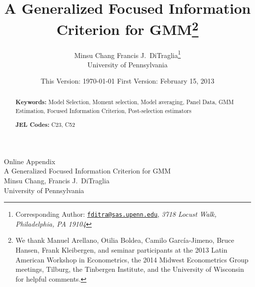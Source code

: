 \documentclass[12pt]{article}
\begin{document}
\title{A Generalized Focused Information Criterion for GMM\footnote{We thank Manuel Arellano, Otilia Boldea, Camilo Garc\'{i}a-Jimeno, Bruce Hansen, Frank Kleibergen, and seminar participants at the 2013 Latin American Workshop in Econometrics, the 2014 Midwest Econometrics Group meetings, Tilburg, the Tinbergen Institute, and the University of Wisconsin for helpful comments.}} 

\author{Minsu Chang \hspace{1em} Francis J.\ DiTraglia\footnote{Corresponding Author:
\href{mailto:fditra@sas.upenn.edu}{\texttt{fditra@sas.upenn.edu}}, \emph{3718 Locust Walk, Philadelphia, PA 19104}}
\\ University of Pennsylvania}

\date{\footnotesize This Version: \today \hspace{0.5em} First Version: February 15, 2013}

\maketitle 
\begin{abstract}
  \singlespacing
	

	\bigskip
	\noindent\textbf{Keywords:} 
  Model Selection, Moment selection, Model averaging, Panel Data, GMM Estimation, Focused Information Criterion, Post-selection estimators

	\medskip
	\noindent\textbf{JEL Codes:} C23, C52 
\end{abstract}










\singlespacing
\small



\appendix


\newpage

\clearpage
\normalsize
{}
\begin{center}
  {\Huge Online Appendix\\}
  \vspace{1em}
  {\Large A Generalized Focused Information Criterion for GMM\\}
  \vspace{2em}
  {\large Minsu Chang, Francis J.\ DiTraglia\\ University of Pennsylvania}
\end{center}

\renewcommand*{\thepage}{Online Appendix - \arabic{page}}
\normalsize




\newpage

\end{document}
